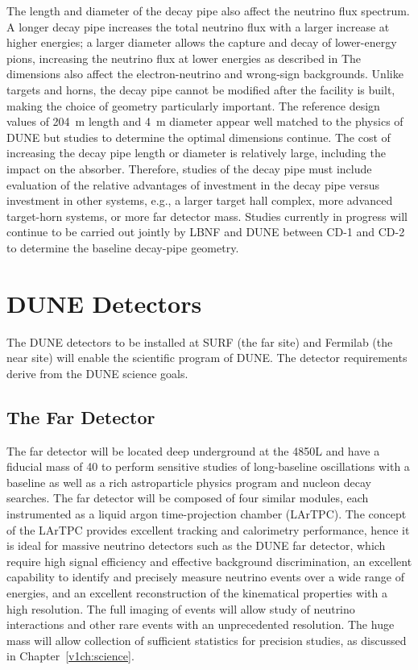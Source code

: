 The length and diameter of the decay pipe also affect the neutrino flux spectrum.  A longer decay pipe increases the total neutrino flux with a larger increase at higher energies; a larger diameter allows the capture and decay of lower-energy pions, 
increasing the neutrino flux at lower energies as described in %
The dimensions also affect the electron-neutrino and wrong-sign backgrounds.  Unlike targets and horns, the decay pipe cannot be modified after the facility is built, making the 
choice of geometry particularly important.  The reference design values of \SI{204}{\meter} length and \SI{4}{\meter} diameter appear well matched to the physics of DUNE but studies to determine the optimal dimensions continue.  The cost of increasing the decay 
pipe length or diameter  is relatively large, including 
the impact on the absorber.
Therefore, studies of the decay pipe must include 
evaluation of the relative advantages of
investment in the decay pipe versus investment in 
other systems, e.g., a larger target hall complex, more advanced target-horn systems, or more far detector mass.  %
Studies currently in progress will continue to be carried out jointly by LBNF and DUNE between CD-1 and CD-2 to determine the baseline decay-pipe geometry.

\section{DUNE Detectors}

The DUNE detectors to be installed at SURF (the far site) and Fermilab (the near site) will enable the scientific program of DUNE.  The detector 
requirements derive from the DUNE science goals.

\subsection{The Far Detector}
The  far detector will be located deep underground at the 4850L and have
a  fiducial mass of \SI{40}{\kt} to perform sensitive studies of long-baseline oscillations with a  baseline as well as a rich astroparticle physics program and nucleon decay searches. The far detector  will be composed of four %
similar modules, each instrumented as a liquid argon time-projection chamber (LArTPC).
The concept of the LArTPC provides
excellent tracking and calorimetry performance, hence it is ideal for massive neutrino detectors such as the DUNE far detector, which require high signal efficiency and effective background discrimination,  an excellent capability to identify and  precisely measure neutrino events over a wide range of energies, and an excellent reconstruction of the kinematical properties
with a high resolution. The full imaging of events will allow study of neutrino interactions and
other rare events with an unprecedented resolution.
 The huge mass will allow collection of sufficient statistics for precision
studies, as discussed in Chapter~\ref{v1ch:science}.

